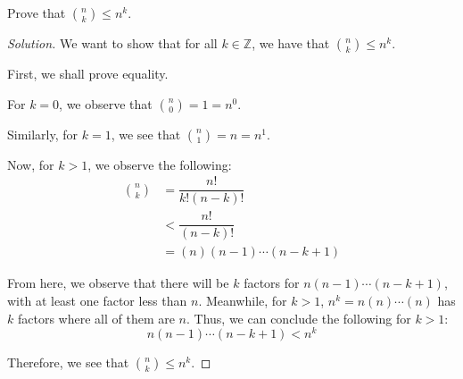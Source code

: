 \documentclass{article}
\newenvironment{solution}{\begin{proof}[Solution]}{\end{proof}}
\newcommand{\ZZ}{\mathbb{Z}}
\begin{document}
\begin{hw}
	Prove that $\binom{n}{k} \le n^k$.
\end{hw}
\begin{solution}
	We want to show that for all $k \in \ZZ$, we have that $\binom{n}{k} \leq n^{k}$.
	
	First, we shall prove equality.
	
	For $k = 0$, we observe that $\binom{n}{0} = 1 = n^{0}$.
	
	Similarly, for $k=1$, we see that $\binom{n}{1} = n = n^{1}$.
	
	Now, for $k > 1$, we observe the following:
	\begin{align*}
		\binom{n}{k} &= \dfrac{n!}{k!(n-k)!} \\
		&< \dfrac{n!}{(n-k)!} \\
		&= (n)(n-1)\cdots(n-k+1)
	\end{align*}

	From here, we observe that there will be $k$ factors for $n(n-1)\cdots(n-k+1)$, with at least one factor less than $n$. Meanwhile, for $k > 1$, $n^{k} = n(n)\cdots(n)$ has $k$ factors where all of them are $n$. Thus, we can conclude the following for $k > 1$:
	\begin{equation*}
		n(n-1)\cdots(n-k+1) < n^{k}
	\end{equation*}

	Therefore, we see that $\binom{n}{k} \leq n^{k}$.
\end{solution}
\end{document}
